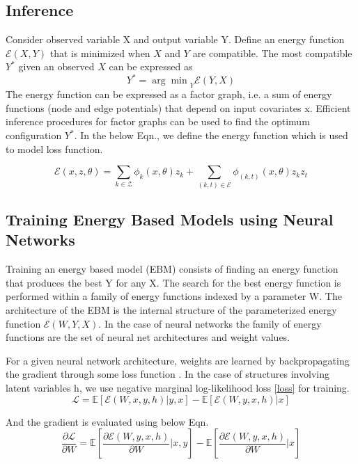 \documentclass{article}
\begin{document}
\subsection{Inference}

Consider observed variable X and output variable Y.
Define an energy function  $\mathcal{E}(X,Y)$ that is minimized  when $X$ and $Y$ are compatible. The most compatible $Y^{*}$ given an observed $X$ can be expressed as
\begin{equation*}{ Y }^{ * }={\arg\min}_{ Y } \mathcal{E}(Y,X)
\end{equation*}
The energy function can be expressed as a factor graph, i.e. a sum of energy functions (node and edge potentials) that depend on input covariates x. Efficient inference procedures for factor graphs can be used to find the optimum configuration $Y^{*}$. In the below Eqn., we define the energy function which is used to model loss function.

 \begin{equation*}
 \mathcal{E}(x,z,\theta)= \sum_{k \in \mathcal{Z}}\phi_{k}(x, \theta)z_{k} + \sum_{(k,t) \in \mathcal{E}}\phi_{(k,t)}(x,\theta)z_{k}z_{t}
\end{equation*}

\subsection{Training Energy Based Models using Neural Networks}
Training an energy based model (EBM) consists of finding an energy function that produces the best Y for any X. The search for the best energy function is performed within a family of energy functions indexed by a parameter W. The architecture of the EBM is the internal structure of the parameterized energy function $\mathcal{E}(W,Y,X)$. In the case of neural networks the family of energy functions are the set of neural net architectures and weight values.



For a given neural network architecture, weights are learned by backpropagating the gradient through some loss function \cite{lossfunctions}. In the case of structures involving  latent variables h, we use negative marginal log-likelihood loss \eqref{loss} for training.
\begin{equation}
 \mathcal{L}=\mathbb{E}\left[\mathcal{E}(W,x,y,h)|y,x \right] - \mathbb{E}\left[\mathcal{E}(W,y,x,h)|x\right]
\label{loss}
\end{equation}

And the gradient is evaluated using below Eqn.
\begin{equation*}
\frac { \partial  \mathcal{L}} { \partial W }  = \mathbb{E}\left[ \frac { \partial  \mathcal{E}(W,y,x,h) }{ \partial W } |x,y \right] -  \mathbb{E}\left[ \frac { \partial \mathcal{E}(W,y,x,h) }{ \partial W } |x \right]
\end{equation*}
\end{document}
